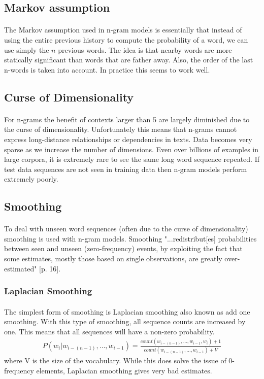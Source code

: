 \documentclass[12pt]{ociamthesis}
\begin{document}
\subsection{Markov assumption}
\paragraph{}
The Markov assumption used in n-gram models is essentially that instead of using the entire previous history to compute the probability of a word, we can use simply the $n$ previous words. The idea is that nearby words are more statically significant than words that are father away. Also, the order of the last n-words is taken into account. In practice this seems to work well.
\subsection{Curse of Dimensionality}
\paragraph{}
For n-grams the benefit of contexts larger than 5 are largely diminished due to the curse of dimensionality. Unfortunately this means that n-grams cannot express long-distance relationships or dependencies in texts. Data becomes very sparse as we increase the number of dimensions. Even over billions of examples in large corpora, it is extremely rare to see the same long word sequence repeated. If test data sequences are not seen in training data then n-gram models perform extremely poorly. 
\subsection{Smoothing}
\paragraph{}
To deal with unseen word sequences (often due to the curse of dimensionality) smoothing is used with n-gram models. Smoothing "...redistribut[es] probabilities between seen and unseen (zero-frequency) events, by
exploiting the fact that some estimates, mostly those based on single observations, are greatly over-estimated" \cite{Mikolav2012}[p. 16].
\subsubsection{Laplacian Smoothing}
\paragraph{}
The simplest form of smoothing is Laplacian smoothing also known as add one smoothing. With this type of smoothing, all sequence counts are increased by one. This means that all sequences will have a non-zero probability. 
\begin{align}
P(w_i | w_{i-(n-1)},\dots, w_{i-1}) = \frac{count(w_{i-(n-1)},\dots,w_{i-1},w_i)+1}{count(w_{i-(n-1)},\dots,w_{i-1})+V}
\end{align}
where V is the size of the vocabulary. While this does solve the issue of 0-frequency elements, Laplacian smoothing gives very bad estimates. 
\end{document}

